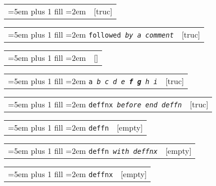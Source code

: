 \documentclass{book}
\begin{document}
%

\noindent\begin{tabularx}{\linewidth}{@{}Xr}
\rightskip=5em plus 1 fill
\hangindent=2em
\texttt{}& [truc]
\end{tabularx}


\noindent\begin{tabularx}{\linewidth}{@{}Xr}
\rightskip=5em plus 1 fill
\hangindent=2em
\texttt{followed \EmbracOn{}\textnormal{\textsl{by a comment}}\EmbracOff{}}& [truc]
\end{tabularx}

%

\noindent\begin{tabularx}{\linewidth}{@{}Xr}
\rightskip=5em plus 1 fill
\hangindent=2em
\texttt{}& []
\end{tabularx}


\noindent\begin{tabularx}{\linewidth}{@{}Xr}
\rightskip=5em plus 1 fill
\hangindent=2em
\texttt{a \EmbracOn{}\textnormal{\textsl{b c d e \textbf{f g} h i}}\EmbracOff{}}& [truc]
\end{tabularx}

%

\noindent\begin{tabularx}{\linewidth}{@{}Xr}
\rightskip=5em plus 1 fill
\hangindent=2em
\texttt{deffnx \EmbracOn{}\textnormal{\textsl{before end deffn}}\EmbracOff{}}& [truc]
\end{tabularx}

%



\noindent\begin{tabularx}{\linewidth}{@{}Xr}
\rightskip=5em plus 1 fill
\hangindent=2em
\texttt{deffn}& [empty]
\end{tabularx}

%


\noindent\begin{tabularx}{\linewidth}{@{}Xr}
\rightskip=5em plus 1 fill
\hangindent=2em
\texttt{deffn \EmbracOn{}\textnormal{\textsl{with deffnx}}\EmbracOff{}}& [empty]
\end{tabularx}

%

\noindent\begin{tabularx}{\linewidth}{@{}Xr}
\rightskip=5em plus 1 fill
\hangindent=2em
\texttt{deffnx}& [empty]
\end{tabularx}
\end{document}
